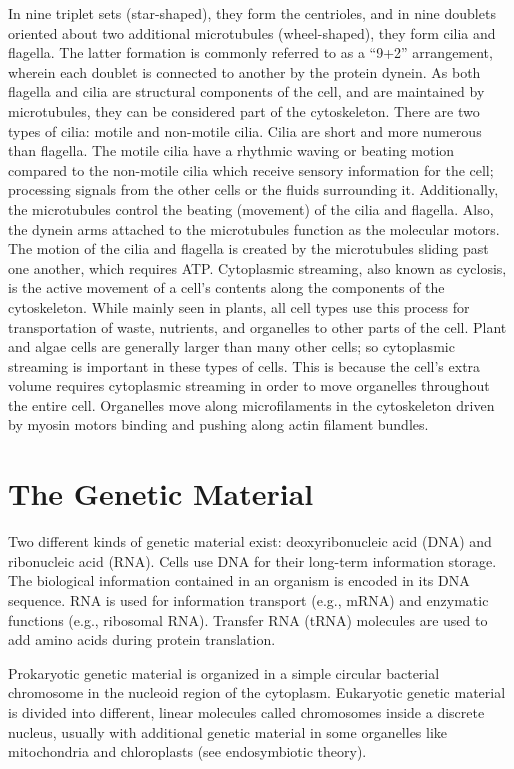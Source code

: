 In nine triplet sets (star-shaped), they form the centrioles, and in nine doublets oriented about two additional microtubules (wheel-shaped), they form cilia and flagella. The latter formation is commonly referred to as a ``9+2'' arrangement, wherein each doublet is connected to another by the protein dynein. As both flagella and cilia are structural components of the cell, and are maintained by microtubules, they can be considered part of the cytoskeleton. There are two types of cilia: motile and non-motile cilia. Cilia are short and more numerous than flagella. The motile cilia have a rhythmic waving or beating motion compared to the non-motile cilia which receive sensory information for the cell; processing signals from the other cells or the fluids surrounding it. Additionally, the microtubules control the beating (movement) of the cilia and flagella. Also, the dynein arms attached to the microtubules function as the molecular motors. The motion of the cilia and flagella is created by the microtubules sliding past one another, which requires ATP.
Cytoplasmic streaming, also known as cyclosis, is the active movement of a cell's contents along the components of the cytoskeleton. While mainly seen in plants, all cell types use this process for transportation of waste, nutrients, and organelles to other parts of the cell. Plant and algae cells are generally larger than many other cells; so cytoplasmic streaming is important in these types of cells. This is because the cell's extra volume requires cytoplasmic streaming in order to move organelles throughout the entire cell. Organelles move along microfilaments in the cytoskeleton driven by myosin motors binding and pushing along actin filament bundles.

\hypertarget{the-genetic-material}{%
\section{The Genetic Material}\label{the-genetic-material}}

Two different kinds of genetic material exist: deoxyribonucleic acid (DNA) and ribonucleic acid (RNA). Cells use DNA for their long-term information storage. The biological information contained in an organism is encoded in its DNA sequence. RNA is used for information transport (e.g., mRNA) and enzymatic functions (e.g., ribosomal RNA). Transfer RNA (tRNA) molecules are used to add amino acids during protein translation.

Prokaryotic genetic material is organized in a simple circular bacterial chromosome in the nucleoid region of the cytoplasm. Eukaryotic genetic material is divided into different, linear molecules called chromosomes inside a discrete nucleus, usually with additional genetic material in some organelles like mitochondria and chloroplasts (see endosymbiotic theory).

